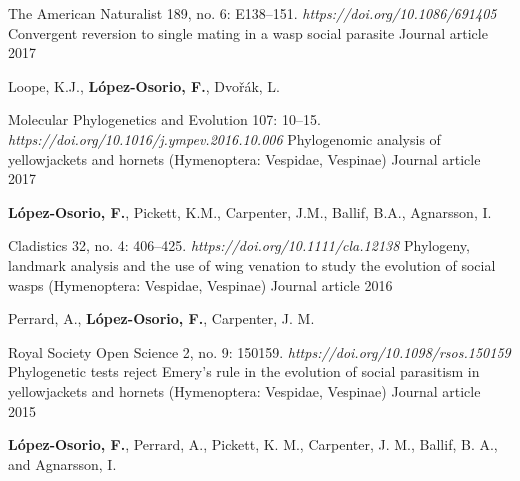 \begin{cventries}
  \cventry
    {The American Naturalist 189, no. 6: E138–151. \textit{https://doi.org/10.1086/691405}} %
    {Convergent reversion to single mating in a wasp social parasite} %
    {Journal article} %
    {2017} %
    {
      \begin{cvitems} %
        \item {Loope, K.J., \textbf{López-Osorio, F.}, Dvořák, L.}
      \end{cvitems}
    }

  \cventry
    {Molecular Phylogenetics and Evolution 107: 10–15. \textit{https://doi.org/10.1016/j.ympev.2016.10.006}} %
    {Phylogenomic analysis of yellowjackets and hornets (Hymenoptera: Vespidae, Vespinae)} %
    {Journal article} %
    {2017} %
    {
      \begin{cvitems} %
        \item {\textbf{López-Osorio, F.}, Pickett, K.M., Carpenter, J.M., Ballif, B.A., Agnarsson, I.}
      \end{cvitems}
    }

  \cventry
    {Cladistics 32, no. 4: 406–425. \textit{https://doi.org/10.1111/cla.12138}} %
    {Phylogeny, landmark analysis and the use of wing venation to study 
    the evolution of social wasps (Hymenoptera: Vespidae, Vespinae)} %
    {Journal article} %
    {2016} %
    {
      \begin{cvitems} %
        \item {Perrard, A., \textbf{López-Osorio, F.}, Carpenter, J. M.}
      \end{cvitems}
    }

  \cventry
    {Royal Society Open Science 2, no. 9: 150159. \textit{https://doi.org/10.1098/rsos.150159}} %
    {Phylogenetic tests reject Emery's rule in the evolution of social parasitism 
    in yellowjackets and hornets (Hymenoptera: Vespidae, Vespinae)} %
    {Journal article} %
    {2015} %
    {
      \begin{cvitems} %
        \item {\textbf{López-Osorio, F.}, Perrard, A., Pickett, K. M., Carpenter, J. M., 
        Ballif, B. A., and Agnarsson, I.}
      \end{cvitems}
    }


\end{cventries}
